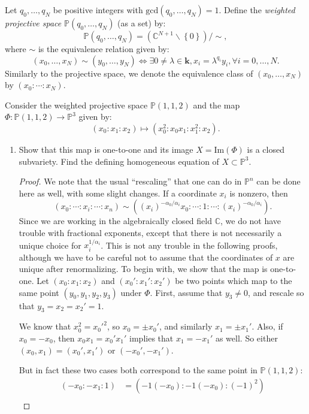 \documentclass[12pt]{article}
\newcommand{\C}{\mathbb{C}}
\renewcommand{\P}{\mathbb{P}}
\theoremstyle{definition}
\newenvironment{problem}[2][Problem]{\begin{trivlist}
\item[\hskip \labelsep {\bfseries #1}\hskip \labelsep {\bfseries #2.}]}{\end{trivlist}}
\begin{document}
\begin{problem}{2}
	Let $q_0, \dots, q_N$ be positive integers with $\text{gcd}(q_0, \dots , q_N) = 1$. Define the \textit{weighted projective space} $\mathbb P(q_0, \dots, q_N)$ (as a set) by:
	\[\mathbb P(q_0, \dots , q_N) = (\mathbb C^{N+1} \backslash \left\{ 0 \right\}) / \sim,\]
	where $\sim$ is the equivalence relation given by: 
	\[(x_0, \dots, x_N) \sim (y_0, \dots , y_N) \iff \exists 0 \neq \lambda \in \mathbf k, x_i = \lambda^{q_i}y_i, \forall i = 0, \dots , N.\]
	Similarly to the projective space, we denote the equivalence class of $(x_0, \dots , x_N)$ by $(x_0 : \cdots : x_N)$.
\par Consider the weighted projective space $\mathbb P(1,1,2)$ and the map $\Phi: \mathbb P(1,1,2) \to \mathbb P^3$ given by:
\[(x_0 : x_1 : x_2 ) \mapsto (x_0^2:x_0x_1 : x_1^2 : x_2).\]
\begin{enumerate}[label=(\alph*)]
	\item Show that this map is one-to-one and its image $X = \text{Im}(\Phi)$ is a closed subvariety. Find the defining homogeneous equation of $X \subset \mathbb P^3$.
		\begin{proof}
			We note that the usual ``rescaling'' that one can do in $\P^n$ can be done here as well, with some slight changes. If a coordinate $x_i$ is nonzero, then 
			\[(x_0:\cdots:x_i: \cdots : x_n) \sim ( (x_i)^{-\alpha_0/\alpha_i}x_0 : \cdots : 1 : \cdots : (x_i)^{-\alpha_0/\alpha_i}).\]
			Since we are working in the algebraically closed field $\C$, we do not have trouble with fractional exponents, except that there is not necessarily a unique choice for $x_i^{1/\alpha_i}$. This is not any trouble in the following proofs, although we have to be careful not to assume that the coordinates of $x$ are unique after renormalizing.
			To begin with, we show that the map is one-to-one. Let $(x_0:x_1:x_2)$ and $(x_0':x_1':x_2')$ be two points which map to the same point $(y_0, y_1, y_2, y_3)$ under $\Phi$. First, assume that $y_3 \neq 0$, and rescale so that $y_3 = x_2 = x_2' = 1$.
			\par We know that $x_0^2 = x_0'^2$, so $x_0 = \pm x_0'$, and similarly $x_1 = \pm x_1'$. Also, if $x_0 = -x_0$, then $x_0x_1 = x_0'x_1'$ implies that $x_1 = -x_1'$ as well. So either $(x_0, x_1) =  (x_0', x_1')$ or $(-x_0', -x_1')$. 
			\par But in fact these two cases both correspond to the same point in $\mathbb P(1,1,2)$:
			\begin{align*}
				(-x_0: -x_1 : 1) &= (-1 (-x_0) : -1(-x_0) : (-1)^2)\\

\end{align*}
\end{proof}
\end{enumerate}
\end{problem}
\end{document}
